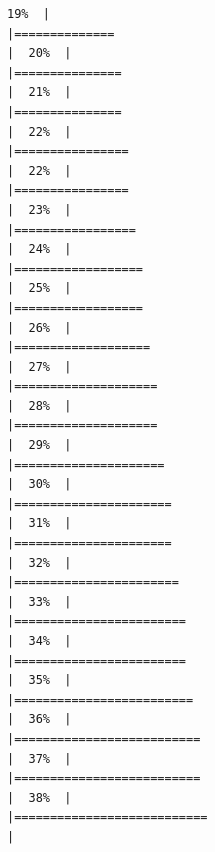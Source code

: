 \documentclass[
]{article}
\begin{document}
\begin{verbatim}
19%  |                                                                              |==============                                                        |  20%  |                                                                              |===============                                                       |  21%  |                                                                              |===============                                                       |  22%  |                                                                              |================                                                      |  22%  |                                                                              |================                                                      |  23%  |                                                                              |=================                                                     |  24%  |                                                                              |==================                                                    |  25%  |                                                                              |==================                                                    |  26%  |                                                                              |===================                                                   |  27%  |                                                                              |====================                                                  |  28%  |                                                                              |====================                                                  |  29%  |                                                                              |=====================                                                 |  30%  |                                                                              |======================                                                |  31%  |                                                                              |======================                                                |  32%  |                                                                              |=======================                                               |  33%  |                                                                              |========================                                              |  34%  |                                                                              |========================                                              |  35%  |                                                                              |=========================                                             |  36%  |                                                                              |==========================                                            |  37%  |                                                                              |==========================                                            |  38%  |                                                                              |===========================                                           |  
\end{verbatim}
\end{document}
